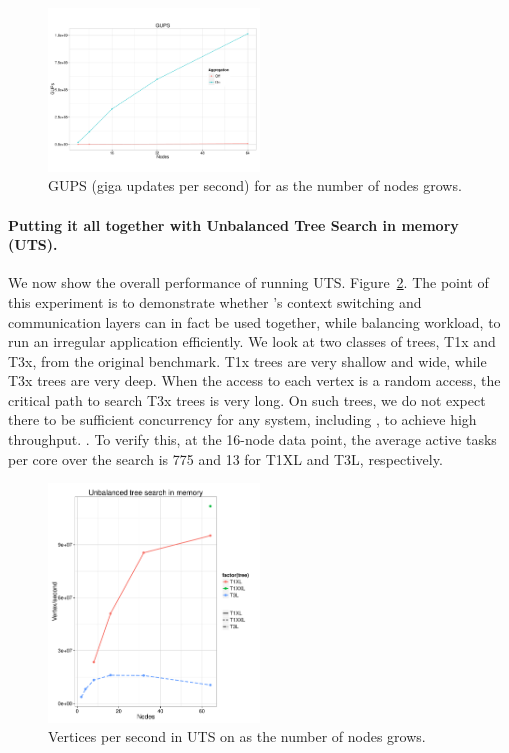 \begin{figure}[ht]
    \begin{center}
      \includegraphics[width=0.5\textwidth]{results/gups/gups.pdf}
    \end{center}
    \caption{GUPS (giga updates per second) for \Grappa as the number of nodes grows.}
    \label{fig:grappa-gups}
\end{figure}

\paragraph{Putting it all together with Unbalanced Tree Search in
    memory (UTS).}
We now show the overall performance of \Grappa running UTS.
Figure~\ref{fig:grappa-uts}. The point of this experiment is to
demonstrate whether \Grappa's context switching and communication layers can in fact
be used together, while balancing workload, to run an irregular application efficiently. 
We look at two classes of trees, T1x and T3x, from the
original benchmark. T1x trees are very shallow and wide, while T3x
trees are very deep. When the access to each vertex is a random
access, the critical path to search T3x trees is very long. On such
trees, we do not expect there to be sufficient concurrency for any
system, including \Grappa, to achieve high throughput. . To verify this, at the 16-node data point, the average active tasks per
core over the search is 775 and 13 for T1XL and T3L, respectively.

\begin{figure}[ht]
    \begin{center}
      \includegraphics[width=0.5\textwidth]{figs/uts_scale.pdf}
    \end{center}
    \caption{Vertices per second in UTS on \Grappa as the number of nodes grows.}
    \label{fig:grappa-uts}
\end{figure}


